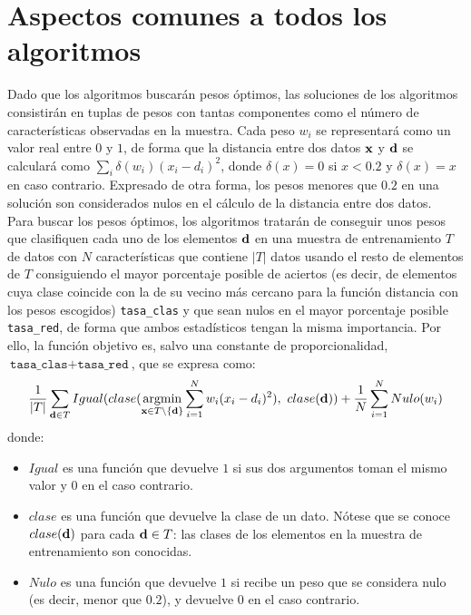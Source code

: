 \documentclass{article}
\DeclareMathOperator*{\argmin}{argmin}
\begin{document}


\section{Aspectos comunes a todos los algoritmos}

Dado que los algoritmos buscarán pesos óptimos, las soluciones de los algoritmos consistirán en tuplas de pesos con tantas componentes como el número de características observadas en la muestra. Cada peso $w_i$ se representará como un valor real entre $0$ y $1$, de forma que la distancia entre dos datos $\normalfont \textbf x$ y $\normalfont \textbf d$ se calculará como $\sum_i \delta(w_i)(x_i - d_i)^2$, donde $\delta(x) = 0$ si $x < 0.2$ y $\delta(x) = x$ en caso contrario. Expresado de otra forma, los pesos menores que $0.2$ en una solución son considerados nulos en el cálculo de la distancia entre dos datos. \\

Para buscar los pesos óptimos, los algoritmos tratarán de conseguir unos pesos que clasifiquen cada uno de los elementos $\normalfont \textbf d$ en una muestra de entrenamiento $T$ de datos con $N$ características que contiene $|T|$ datos usando el resto de elementos de $T$ consiguiendo el mayor porcentaje posible de aciertos (es decir, de elementos cuya clase coincide con la de su vecino más cercano para la función distancia con los pesos escogidos) \texttt{tasa\_clas} y que sean nulos en el mayor porcentaje posible \texttt{tasa\_red}, de forma que ambos estadísticos tengan la misma importancia. Por ello, la función objetivo es, salvo una constante de proporcionalidad, $\texttt{tasa\_clas} + \texttt{tasa\_red}$, que se expresa como: $$\frac 1 {|T|} \sum_{\normalfont \textbf d \in T} Igual(clase(\argmin_{\normalfont \textbf x \in T \setminus \{ \normalfont \textbf d \}} \sum_{i = 1}^N w_i(x_i - d_i)^2),\ clase(\normalfont \textbf d)) + \frac 1 N \sum_{i = 1}^N Nulo(w_i)$$
donde:
\begin{itemize}
	 \item $Igual$ es una función que devuelve $1$ si sus dos argumentos toman el mismo valor y $0$ en el caso contrario.
	\item $clase$ es una función que devuelve la clase de un dato. Nótese que se conoce $clase(\normalfont \textbf d)$ para cada $\normalfont \textbf d \in T$: las clases de los elementos en la muestra de entrenamiento son conocidas.
	\item $Nulo$ es una función que devuelve $1$ si recibe un peso que se considera nulo (es decir, menor que $0.2$), y devuelve $0$ en el caso contrario.
\end{itemize}
\end{document}
